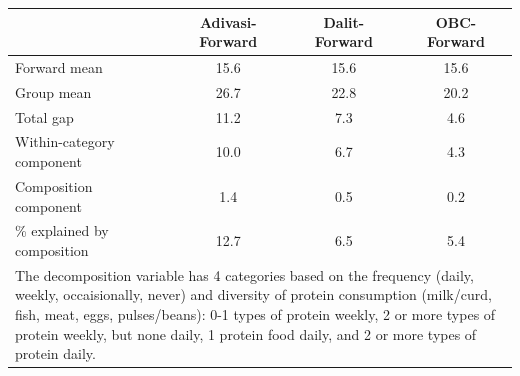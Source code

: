 \begin{tabular}{l*{3}{c}}
\hline\hline
            &\multicolumn{1}{c}{Adivasi-Forward}&\multicolumn{1}{c}{Dalit-Forward}&\multicolumn{1}{c}{OBC-Forward}\\
\hline
\hline
Forward mean&        15.6&        15.6&        15.6\\
Group mean  &        26.7&        22.8&        20.2\\
Total gap   &        11.2&         7.3&         4.6\\
Within-category component&        10.0&         6.7&         4.3\\
Composition component&         1.4&         0.5&         0.2\\
\% explained by composition&        12.7&         6.5&         5.4\\
\hline\hline
\multicolumn{4}{l}{\footnotesize \parbox[t]{0.95\linewidth}{The decomposition variable has 4 categories based on the frequency (daily, weekly, occaisionally, never) and diversity of protein consumption (milk/curd, fish, meat, eggs, pulses/beans): 0-1 types of protein weekly, 2 or more types of protein weekly, but none daily, 1 protein food daily, and 2 or more types of protein daily.}}\\
\end{tabular}
